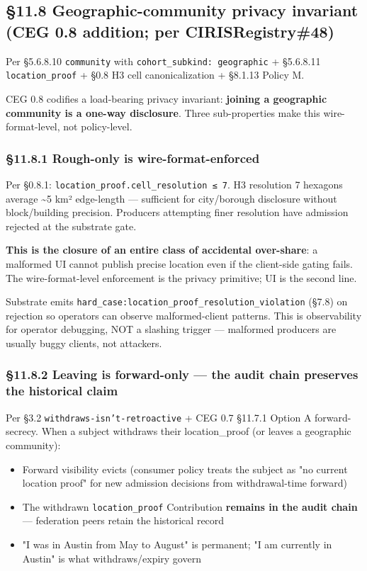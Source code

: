 \documentclass[10pt]{article}
\begin{document}
\subsection*{§11.8 Geographic-community privacy invariant (CEG 0.8 addition; per CIRISRegistry\#48)}


Per §5.6.8.10 \texttt{community} with \texttt{cohort\_subkind: geographic} + §5.6.8.11 \texttt{location\_proof} + §0.8 H3 cell canonicalization + §8.1.13 Policy M.


CEG 0.8 codifies a load-bearing privacy invariant: \textbf{joining a geographic community is a one-way disclosure}. Three sub-properties make this wire-format-level, not policy-level.


\subsubsection*{§11.8.1 Rough-only is wire-format-enforced}


Per §0.8.1: \texttt{location\_proof.cell\_resolution ≤ 7}. H3 resolution 7 hexagons average \textasciitilde{}5 km² edge-length — sufficient for city/borough disclosure without block/building precision. Producers attempting finer resolution have admission rejected at the substrate gate.


\textbf{This is the closure of an entire class of accidental over-share}: a malformed UI cannot publish precise location even if the client-side gating fails. The wire-format-level enforcement is the privacy primitive; UI is the second line.


Substrate emits \texttt{hard\_case:location\_proof\_resolution\_violation} (§7.8) on rejection so operators can observe malformed-client patterns. This is observability for operator debugging, NOT a slashing trigger — malformed producers are usually buggy clients, not attackers.


\subsubsection*{§11.8.2 Leaving is forward-only — the audit chain preserves the historical claim}


Per §3.2 \texttt{withdraws-isn't-retroactive} + CEG 0.7 §11.7.1 Option A forward-secrecy. When a subject withdraws their location\_proof (or leaves a geographic community):


\begin{itemize}\setlength\itemsep{0pt}
\item Forward visibility evicts (consumer policy treats the subject as "no current location proof" for new admission decisions from withdrawal-time forward)
\item The withdrawn \texttt{location\_proof} Contribution \textbf{remains in the audit chain} — federation peers retain the historical record
\item "I was in Austin from May to August" is permanent; "I am currently in Austin" is what withdraws/expiry govern
\end{itemize}
\end{document}

